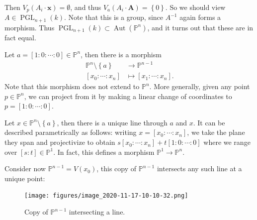 Then \(V_p(A_i \cdot \mathbf{x}) = \emptyset\), and thus
\(V_a(A_i \cdot \mathbf{A}) = \left\{{0}\right\}\). So we should view
\(A\in \operatorname{PGL}_{n+1}(k)\). Note that this is a group, since
\(A^{-1}\) again forms a morphism. Thus
\(\operatorname{PGL}_{n+1}(k) \subset {\operatorname{Aut}}({\mathbb{P}}^n)\),
and it turns out that these are in fact equal.

\begin{definition}

Let \(a = [1: 0 : \cdots : 0] \in {\mathbb{P}}^n\), then there is a
morphism
\begin{align*}  
{\mathbb{P}}^n \setminus\left\{{a}\right\} &\to {\mathbb{P}}^{n-1} \\
[x_0: \cdots : x_n] &\mapsto [x_1: \cdots : x_n]
.\end{align*}
Note that this morphism does not extend to \({\mathbb{P}}^n\). More
generally, given any point \(p\in {\mathbb{P}}^n\), we can project from
it by making a linear change of coordinates to
\(p = [1: 0 : \cdots : 0]\).

\end{definition}

Let \(x\in {\mathbb{P}}^n\setminus\left\{{a}\right\}\), then there is a
unique line through \(a\) and \(x\). It can be described parametrically
as follows: writing \(x = [x_0: \cdots : x_n]\), we take the plane they
span and projectivize to obtain
\(s[x_0 : \cdots : x_n] + t [1: 0 : \cdots : 0]\) where we range over
\([s: t] \in {\mathbb{P}}^1\). In fact, this defines a morphism
\({\mathbb{P}}^1 \to {\mathbb{P}}^n\).

Consider now \({\mathbb{P}}^{n-1} = V(x_0)\), this copy of
\({\mathbb{P}}^{n-1}\) intersects any such line at a unique point:

\begin{figure}
\centering
\texttt{[image: figures/image\_2020-11-17-10-10-32.png]}
\caption{Copy of \({\mathbb{P}}^{n-1}\) intersecting a line.}
\end{figure}

